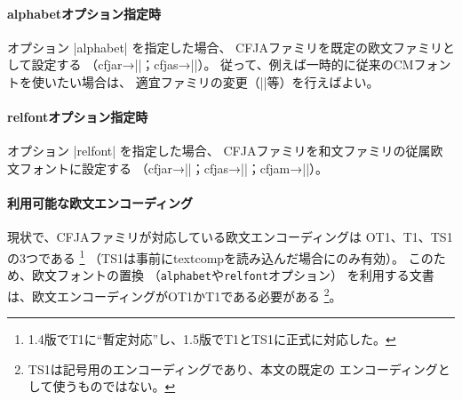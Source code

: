 \documentclass[uplatex,dvipdfmx,a4paper]{jsarticle}
\newcommand{\Pkg}[1]{\textsf{#1}}
\begin{document}
\paragraph{alphabetオプション指定時}
オプション |alphabet| を指定した場合、
CFJAファミリを既定の欧文ファミリとして設定する
（cfjar→|\rmdefault|；cfjas→|\sfdefault|）。
従って、例えば一時的に従来のCMフォントを使いたい場合は、
適宜ファミリの変更（||等）を行えばよい。

\paragraph{relfontオプション指定時}
オプション |relfont| を指定した場合、
CFJAファミリを和文ファミリの従属欧文フォントに設定する
（cfjar→|\mcfamily|；cfjas→|\gtfamily|；cfjam→|\mgfamily|）。

\paragraph{利用可能な欧文エンコーディング}
現状で、CFJAファミリが対応している欧文エンコーディングは
OT1、T1、TS1の3つである
\footnote{1.4版でT1に“暫定対応”し、1.5版でT1とTS1に正式に対応した。}%
（TS1は事前に\Pkg{textcomp}を読み込んだ場合にのみ有効）。
このため、欧文フォントの置換
（\texttt{alphabet}や\texttt{relfont}オプション）
を利用する文書は、欧文エンコーディングがOT1かT1である必要がある
\footnote{TS1は記号用のエンコーディングであり、本文の既定の
エンコーディングとして使うものではない。}。
\end{document}
